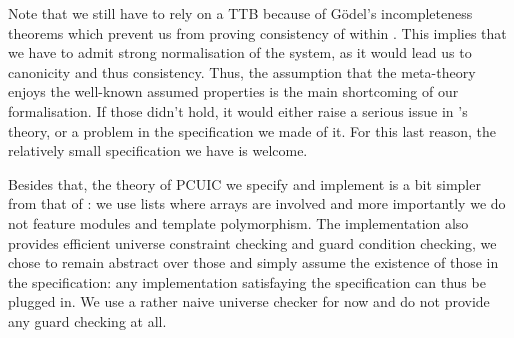 Note that we still have to rely on a \acrshort{TTB} because of Gödel's
incompleteness theorems which prevent us from proving consistency of
\Coq within \Coq.
This implies that we have to admit strong normalisation of the system, as it
would lead us to canonicity and thus consistency.
Thus, the assumption that the meta-theory enjoys the well-known assumed
properties is the main shortcoming of our formalisation. If those didn't hold,
it would either raise a serious issue in \Coq's theory, or a problem in the
specification we made of it. For this last reason, the relatively small
specification we have is welcome.

Besides that, the theory of \acrshort{PCUIC} we specify and implement is a bit
simpler from that of \Coq: we use lists where arrays are involved and more
importantly we do not feature modules and template polymorphism.
The implementation also provides efficient universe constraint checking and
guard condition checking, we chose to remain abstract over those and simply
assume the existence of those in the specification: any implementation
satisfaying the specification can thus be plugged in. We use a rather naive
universe checker for now and do not provide any guard checking at all.